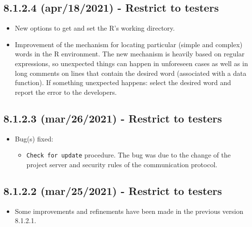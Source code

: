\subsection*{8.1.2.4 (apr/18/2021) - Restrict to testers}
\begin{itemize}
  \item New options to get and set the R's working directory.
  \item Improvement of the mechanism for locating particular (simple and complex) words in the R environment.
    The new mechanism is heavily based on regular expressions, so unexpected things can happen in unforeseen
    cases as well as in long comments on lines that contain the desired word (associated with a data function).
    If something unexpected happens: select the desired word and report the error to the developers.
\end{itemize}

\subsection*{8.1.2.3 (mar/26/2021) - Restrict to testers}
\begin{itemize}
  \item Bug(s) fixed:
    \begin{itemize}
      \item \texttt{Check for update} procedure. The bug was due to the change of the project server and
        security rules of the communication protocol.
    \end{itemize}
\end{itemize}

\subsection*{8.1.2.2 (mar/25/2021) - Restrict to testers}
\begin{itemize}
  \item Some improvements and refinements have been made in the previous version 8.1.2.1.
\end{itemize}

